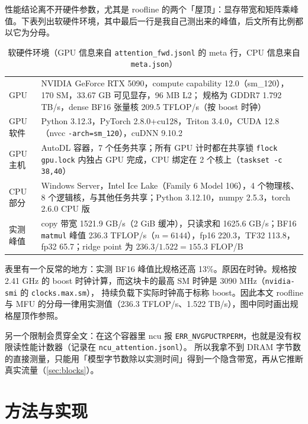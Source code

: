 \documentclass[11pt,a4paper]{ctexart}
\begin{document}
性能结论离不开硬件参数，尤其是 roofline 的两个「屋顶」：显存带宽和矩阵乘峰值。下表列出软硬件环境，其中最后一行是我自己测出来的峰值，后文所有比例都以它为分母。

\begin{table}[H]
\centering\small
\caption{软硬件环境（GPU 信息来自 \texttt{attention\_fwd.jsonl} 的 meta 行，CPU 信息来自 \texttt{meta.json}）}
\begin{tabularx}{\linewidth}{lX}
\toprule
GPU & NVIDIA GeForce RTX 5090，compute capability 12.0（sm\_120），170 SM，33.67 GB 可见显存，96 MB L2；
规格为 GDDR7 1.792 TB/s，dense BF16 张量核 209.5 TFLOP/s（按 boost 时钟）\\
GPU 软件 & Python 3.12.3，PyTorch 2.8.0+cu128，Triton 3.4.0，CUDA 12.8（nvcc \texttt{-arch=sm\_120}），cuDNN 9.10.2 \\
GPU 主机 & AutoDL 容器，7 个任务共享；所有 GPU 计时都在共享锁 \texttt{flock gpu.lock} 内独占 GPU 完成，CPU 绑定在 2 个核上（\texttt{taskset -c 38,40}）\\
CPU 部分 & Windows Server，Intel Ice Lake（Family 6 Model 106），4 个物理核、8 个逻辑核，与其他任务共享；Python 3.12.10，numpy 2.5.3，torch 2.6.0 CPU 版 \\
实测峰值 & copy 带宽 1521.9 GB/s（2 GiB 缓冲），只读求和 1625.6 GB/s；BF16 \texttt{matmul} 峰值 236.3 TFLOP/s（$n=6144$），fp16 220.3，TF32 113.8，fp32 65.7；ridge point 为 $236.3/1.522=155.3$ FLOP/B \\
\bottomrule
\end{tabularx}
\end{table}

表里有一个反常的地方：实测 BF16 峰值比规格还高 13\%。原因在时钟。规格按 2.41 GHz 的 boost 时钟计算，而这块卡的最高 SM 时钟是 3090 MHz（\texttt{nvidia-smi} 的 \texttt{clocks.max.sm}），
持续负载下实际时钟高于标称 boost。因此本文 roofline 与 MFU 的分母一律用实测值（236.3 TFLOP/s、1.522 TB/s），图中同时画出规格屋顶作参照。

另一个限制会贯穿全文：在这个容器里 ncu 报 \texttt{ERR\_NVGPUCTRPERM}，也就是没有权限读性能计数器（记录在 \texttt{ncu\_attention.jsonl}）。
所以我拿不到 DRAM 字节数的直接测量，只能用「模型字节数除以实测时间」得到一个隐含带宽，再从它推断真实流量（\cref{sec:blocks}）。

\section{方法与实现}
\end{document}
